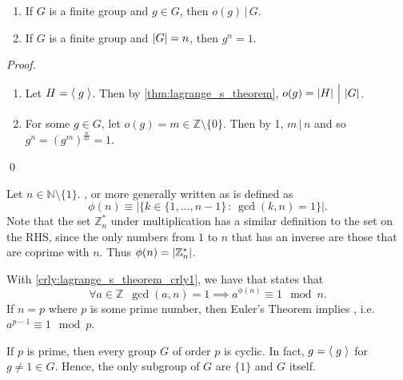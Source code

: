 \begin{crly}
\label{crly:lagrange_s_theorem_crly1}
  \begin{enumerate}
    \item If $G$ is a finite group and $g \in G$, then $o(g) \, \Big| \, G$.
    \item If $G$ is a finite group and $\left|G\right| = n$, then $g^n = 1$.
  \end{enumerate}
\end{crly}

\begin{proof}
  \begin{enumerate}
    \item Let $H = \langle \; g \; \rangle$. Then by \autoref{thm:lagrange_s_theorem}, $o(g) = \left|H\right| \, \Big| \, \left|G\right|$.

    \item For some $g \in G$, let $o(g) = m \in \mathbb{Z} \setminus \{0\}$. Then by 1, $m \, | \, n$ and so $g^n = (g^m)^{\frac{n}{m}} = 1$.
  \end{enumerate}\qed
\end{proof}

\begin{note}
  Let $n \in \mathbb{N} \setminus \{1\}$. , or more generally written as  is defined as
  \begin{equation}\label{eq:euler_s_totient_function}
    \phi(n) \equiv \Big| \big\{k \in \{1, ..., n - 1\} \, : \, \gcd(k, n) = 1 \big\} \Big|.
  \end{equation}
  Note that the set $\mathbb{Z}_n^*$ under multiplication has a similar definition to the set on the RHS, since the only numbers from $1$ to $n$ that has an inverse are those that are coprime with $n$. Thus $\phi(n) = \left|\mathbb{Z}_n^*\right|$.

  With \cref{crly:lagrange_s_theorem_crly1}, we have  that states that
  \begin{equation}\label{eq:euler_s_theorem}
    \forall a \in \mathbb{Z} \enspace \gcd(a, n) = 1 \implies a^{\phi(n)} \equiv 1 \mod n.
  \end{equation}
  If $n = p$ where $p$ is some prime number, then Euler's Theorem implies , i.e. $a^{p - 1} \equiv 1 \mod p$.
\end{note}

\begin{crly}
\label{crly:lagrange_s_theorem_crly2}
  If $p$ is prime, then every group $G$ of order $p$ is cyclic. In fact, $g = \langle \; g \; \rangle$ for $g \neq 1 \in G$. Hence, the only subgroup of $G$ are $\{1\}$ and $G$ itself.
\end{crly}


